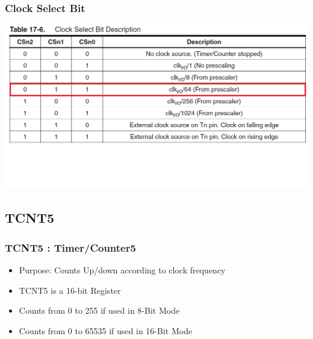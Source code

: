 \documentclass[10pt,red]{beamer}
\begin{document}
\begin{frame}
		\frametitle{Clock Select Bit} \pause
			\includegraphics[width = \linewidth]{clock_select_bit} 
\end{frame}

\subsection{TCNT5}
\begin{frame}
		\frametitle{TCNT5 : Timer/Counter5} \pause
			\begin{itemize}
				\item<+-|alert@+> Purpose: Counts Up/down according to clock frequency \\[10pt]
				\item<+-|alert@+> TCNT5 is a 16-bit Register  \\[10pt]
				\item<+-|alert@+> Counts from 0 to 255 if used in 8-Bit Mode \\[10pt]
				\item<+-|alert@+> Counts from 0 to 65535 if used in 16-Bit Mode \\[10pt]
			\end{itemize}
\end{frame}	
\end{document}
